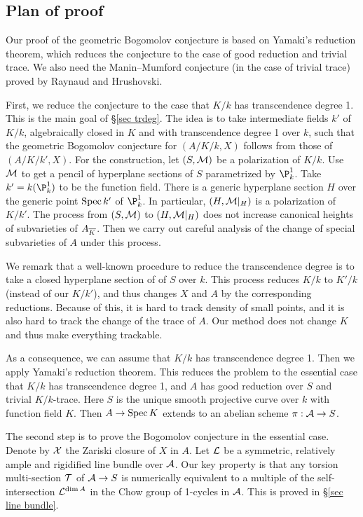 \subsection{Plan of proof}

Our proof of the geometric Bogomolov conjecture is based on Yamaki's reduction theorem, which reduces the conjecture to the case of good reduction and trivial trace.
We also need the Manin--Mumford conjecture (in the case of trivial trace) proved by Raynaud and Hrushovski.

First, we reduce the conjecture to the case that $K/k$ has transcendence degree 1. This is the main goal of \S\ref{sec trdeg}.
The idea is to take intermediate fields $k'$ of $K/k$, algebraically closed in $K$ and with transcendence degree 1 over $k$, such that the geometric Bogomolov conjecture for $(A/K/k,X)$ follows from those of $(A/K/k',X)$.
For the construction, let $(S,{\mathcal M})$ be a polarization of $K/k$.
Use ${\mathcal M}$ to get a pencil of hyperplane sections of $S$
parametrized by $\P_k^1$. Take $k'=k(\P_k^1)$ to be the function field.
There is a generic hyperplane section $H$ over the generic point ${\rm Spec \,} k'$ of $\P_k^1$.
In particular, $(H,{\mathcal M}|_H)$ is a polarization of $K/k'$.
The process from $(S,{\mathcal M})$ to $(H,{\mathcal M}|_H)$ does not increase canonical heights of subvarieties of $A_{\overline{K}}$.
Then we carry out careful analysis of the change of special subvarieties of $A$ under this process.

We remark that a well-known procedure to reduce the transcendence degree is to take a closed hyperplane section of
of $S$ over $k$. This process reduces $K/k$ to $K'/k$ (instead of our $K/k'$), and thus changes $X$ and $A$ by the corresponding reductions. Because of this, it is hard to track density of small points, and it is also hard to track the change of the trace of $A$.
Our method does not change $K$ and thus make everything trackable.

As a consequence, we can assume that $K/k$ has transcendence degree 1.
Then we apply Yamaki's reduction theorem.
This reduces the problem to the essential case that $K/k$ has transcendence degree 1,
and $A$ has good reduction over $S$ and trivial $K/k$-trace.
Here $S$ is the unique smooth projective curve over $k$ with function field $K$.
Then $A\to {\rm Spec \,} K$ extends to an abelian scheme $\pi:{\mathcal A}\to S$.


The second step is to prove the Bogomolov conjecture in the essential case.
Denote by ${\mathcal X}$ the Zariski closure of $X$ in $A$.
Let ${\mathcal L}$ be a symmetric, relatively ample and rigidified line bundle over ${\mathcal A}$.
Our key property is that any torsion multi-section ${\mathcal T}$ of ${\mathcal A}\to S$ is numerically equivalent to a multiple of the self-intersection ${\mathcal L}^{\dim A}$ in the Chow group of 1-cycles in ${\mathcal A}$.
This is proved in \S\ref{sec line bundle}.

